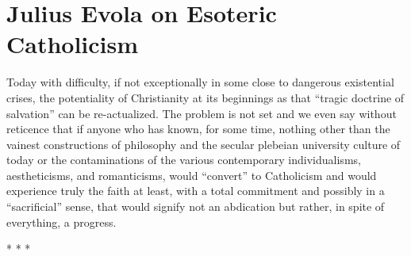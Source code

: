 \section{Julius Evola on Esoteric Catholicism}

\begin{quotex}
Today with difficulty, if not exceptionally in some close to dangerous existential crises, the potentiality of Christianity at its beginnings as that ``tragic doctrine of salvation'' can be re-actualized. The problem is not set and we even say without reticence that if anyone who has known, for some time, nothing other than the vainest constructions of philosophy and the secular plebeian university culture of today or the contaminations of the various contemporary individualisms, aestheticisms, and romanticisms, would ``convert'' to Catholicism and would experience truly the faith at least, with a total commitment and possibly in a ``sacrificial'' sense, that would signify not an abdication but rather, in spite of everything, a progress.

\end{quotex}


\begin{center}* * *\end{center}

